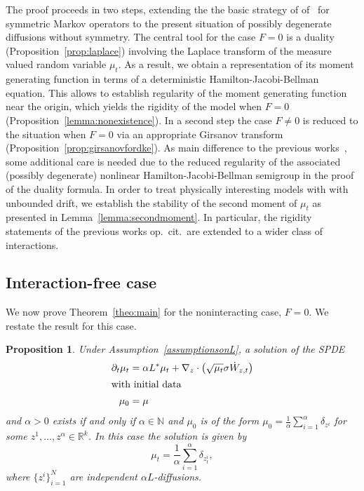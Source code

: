 \documentclass{article}
\newtheorem{proposition}[theorem]{Proposition}
\newcommand{\R}{\mathbb{R}}
\newcommand{\N}{\mathbb{N}}
\newcommand{\F}{F}
\begin{document}
The proof proceeds in two steps, extending the the basic strategy of of~\cite{Konarovskyi2019a,
  Konarovskyi2020a} for symmetric Markov operators to the present situation of possibly degenerate diffusions
without symmetry.  The central tool for the case $F=0$ is a duality (Proposition~\ref{prop:laplace}) involving
the Laplace transform of the measure valued random variable $\mu_t$. As a result, we obtain a representation
of its moment generating function in terms of a deterministic Hamilton-Jacobi-Bellman equation. This allows to
establish regularity of the moment generating function near the origin, which yields the rigidity of the model
when $F=0$ (Proposition~\ref{lemma:nonexistence}). In a second step the case $F\ne 0$ is reduced to the
situation when $F=0$ via an appropriate Girsanov transform (Proposition~\ref{prop:girsanovfordke}). As main
difference to the previous works~\cite{Konarovskyi2019a, Konarovskyi2020a}, some additional care is needed due
to the reduced regularity of the associated (possibly degenerate) nonlinear Hamilton-Jacobi-Bellman semigroup
in the proof of the duality formula. In order to treat physically interesting models with with unbounded
drift, we establish the stability of the second moment of $\mu_t$ as presented in
Lemma~\ref{lemma:secondmoment}. In particular, the rigidity statements of the previous works op.\ cit.\ are
extended to a wider class of interactions.


\subsection{Interaction-free case}
\label{sec.Fnull}

We now prove Theorem~\ref{theo:main} for the noninteracting case, $\F=0$. We restate the result for this case.


    
\begin{proposition}
  \label{prop:DK-L-allg}
  Under Assumption~\ref{assumptionsonL}, a solution of the SPDE 
  \begin{align}
    \partial_t \mu_t &= \alpha L^* 
                       \mu_t + \nabla_z \cdot \left( \sqrt{\mu_t} \sigma \dot{W}_{z,t} \right)
                       \label{eqn:F0} \\
    \intertext{with initial data} 
    \mu_0 &= \mu \label{eqn:F0-IC}
  \end{align}
  and $\alpha>0$ exists if and only if $\alpha \in \N$ and $\mu_0$ is of the form
  $ \mu_0= \frac{1}{\alpha } \sum_{i =1}^\alpha \delta_{z^i}$ for some $z^1, \dots, z^\alpha \in \R^k$. In
  this case the solution is given by
  \begin{equation*}
    \mu_t = \frac 1 \alpha \sum_{i=1}^\alpha \delta_{z^i_t},
  \end{equation*}
  where $\{z^i_\cdot\}_{i=1}^N$ are independent $\alpha L$-diffusions.
\end{proposition}
\end{document}
